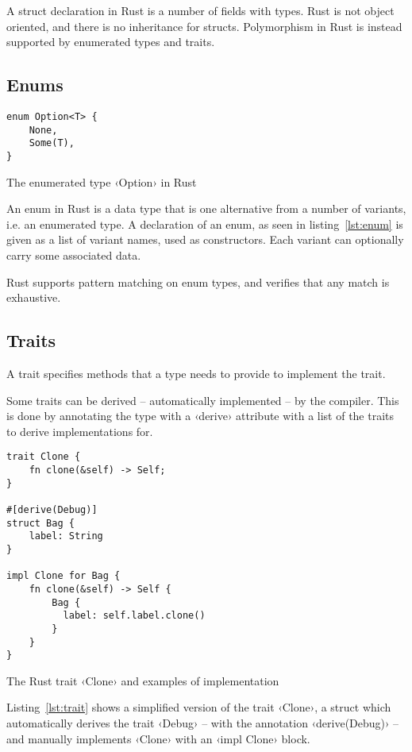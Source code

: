 A struct declaration in Rust is a number of fields with types. Rust is not object oriented, and there is no inheritance for structs. Polymorphism in Rust is instead supported by enumerated types and traits.

\subsection{Enums}

\begin{listing}[ht!]
\begin{verbatim}
enum Option<T> {
    None,
    Some(T),
}
\end{verbatim}
\caption{The enumerated type ‹Option› in Rust}
\label{lst:enum}
\end{listing}

An enum in Rust is a data type that is one alternative from a number of variants, i.e. an enumerated type. A declaration of an enum, as seen in listing~\ref{lst:enum} is given as a list of variant names, used as constructors. Each variant can optionally carry some associated data.

Rust supports pattern matching on enum types, and verifies that any match is exhaustive.

\subsection{Traits}
\label{sec:traits}

A trait specifies methods that a type needs to provide to implement the trait.

Some traits can be derived -- automatically implemented -- by the compiler. This is done by annotating the type with a ‹derive› attribute with a list of the traits to derive implementations for.

\begin{listing}[ht!]
\begin{verbatim}
trait Clone {
    fn clone(&self) -> Self;
}

#[derive(Debug)]
struct Bag {
    label: String
}

impl Clone for Bag {
    fn clone(&self) -> Self {
        Bag {
          label: self.label.clone()
        }
    }
}
\end{verbatim}
\caption{The Rust trait ‹Clone› and examples of implementation}
\label{lst:trait}
\end{listing}

Listing~\ref{lst:trait} shows a simplified version of the trait ‹Clone›, a struct which automatically derives the trait ‹Debug› -- with the annotation ‹derive(Debug)› -- and manually implements ‹Clone› with an ‹impl Clone› block.

